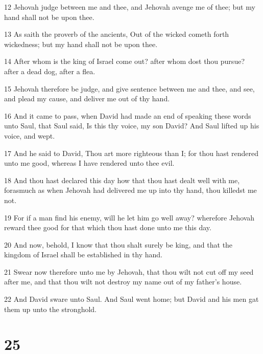 \par 12 Jehovah judge between me and thee, and Jehovah avenge me of thee; but my hand shall not be upon thee.
\par 13 As saith the proverb of the ancients, Out of the wicked cometh forth wickedness; but my hand shall not be upon thee.
\par 14 After whom is the king of Israel come out? after whom dost thou pursue? after a dead dog, after a flea.
\par 15 Jehovah therefore be judge, and give sentence between me and thee, and see, and plead my cause, and deliver me out of thy hand.
\par 16 And it came to pass, when David had made an end of speaking these words unto Saul, that Saul said, Is this thy voice, my son David? And Saul lifted up his voice, and wept.
\par 17 And he said to David, Thou art more righteous than I; for thou hast rendered unto me good, whereas I have rendered unto thee evil.
\par 18 And thou hast declared this day how that thou hast dealt well with me, forasmuch as when Jehovah had delivered me up into thy hand, thou killedst me not.
\par 19 For if a man find his enemy, will he let him go well away? wherefore Jehovah reward thee good for that which thou hast done unto me this day.
\par 20 And now, behold, I know that thou shalt surely be king, and that the kingdom of Israel shall be established in thy hand.
\par 21 Swear now therefore unto me by Jehovah, that thou wilt not cut off my seed after me, and that thou wilt not destroy my name out of my father's house.
\par 22 And David sware unto Saul. And Saul went home; but David and his men gat them up unto the stronghold.

\chapter{25}

